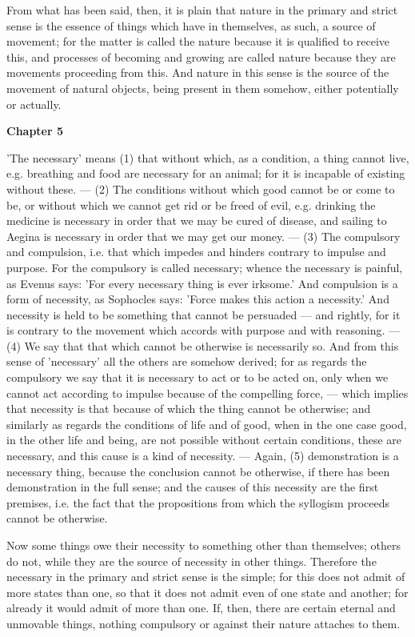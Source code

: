 From what has been said, then, it is plain that nature in the primary and strict sense is the essence of things which have in themselves, as such, a source of movement; for the matter is called the nature because it is qualified to receive this, and processes of becoming and growing are called nature because they are movements proceeding from this. And nature in this sense is the source of the movement of natural objects, being present in them somehow, either potentially or actually.

\textbf{Chapter 5}

'The necessary' means (1) that without which, as a condition, a thing cannot live, e.g. breathing and food are necessary for an animal; for it is incapable of existing without these. — (2) The conditions without which good cannot be or come to be, or without which we cannot get rid or be freed of evil, e.g. drinking the medicine is necessary in order that we may be cured of disease, and sailing to Aegina is necessary in order that we may get our money. — (3) The compulsory and compulsion, i.e. that which impedes and hinders contrary to impulse and
purpose. For the compulsory is called necessary; whence the necessary is painful, as Evenus says: 'For every necessary thing is ever irksome.' And compulsion is a form of necessity, as Sophocles says: 'Force makes this action a necessity.' And necessity is held to be something that cannot be persuaded — and rightly, for it is contrary to the movement
which accords with purpose and with reasoning. — (4) We say that that which cannot be otherwise is necessarily so. And from this sense of 'necessary' all the others are somehow derived; for as regards the compulsory we say that it is necessary to act or to be acted on, only when we cannot act according to impulse because of the compelling force, — which implies that necessity is that because of which the thing cannot be otherwise; and similarly as regards the conditions of life and of good, when in the one case good, in the other life and being, are not possible without certain conditions, these are necessary, and this cause is a kind of necessity. — Again, (5) demonstration is a necessary thing, because the conclusion cannot be otherwise, if there has been demonstration in the full sense; and the causes of this necessity are the first premises, i.e. the fact that the propositions from which the syllogism proceeds cannot be otherwise.

Now some things owe their necessity to something other than themselves; others do not, while they are the source of necessity in other things. Therefore the necessary in the primary and strict sense is the simple; for this does not admit of more states than one, so that it does not admit even of one state and another; for already it would admit of more than one. If, then, there are certain eternal and unmovable things, nothing compulsory or against their nature attaches to them.

